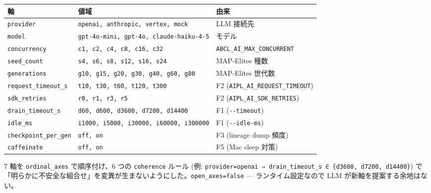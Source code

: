 \documentclass[
]{ltjsarticle}
\newcounter{none} %
\begin{document}
{\def\LTcaptype{none} %
\begin{longtable}[]{@{}
  >{\raggedright\arraybackslash}p{}
  >{\raggedright\arraybackslash}p{}
  >{\raggedright\arraybackslash}p{}@{}}
\toprule\noalign{}
\begin{minipage}[b]{\linewidth}\raggedright
軸
\end{minipage} & \begin{minipage}[b]{\linewidth}\raggedright
値域
\end{minipage} & \begin{minipage}[b]{\linewidth}\raggedright
由来
\end{minipage} \\
\midrule\noalign{}
\endhead
\bottomrule\noalign{}
\endlastfoot
\texttt{provider} & \texttt{openai,\ anthropic,\ vertex,\ mock} & LLM
接続先 \\
\texttt{model} & \texttt{gpt-4o-mini,\ gpt-4o,\ claude-haiku-4-5} &
モデル \\
\texttt{concurrency} & \texttt{c1,\ c2,\ c4,\ c8,\ c16,\ c32} &
\texttt{ABCL\_AI\_MAX\_CONCURRENT} \\
\texttt{seed\_count} & \texttt{s4,\ s6,\ s8,\ s12,\ s16,\ s24} &
MAP-Elites 種数 \\
\texttt{generations} & \texttt{g10,\ g15,\ g20,\ g30,\ g40,\ g60,\ g80}
& MAP-Elites 世代数 \\
\texttt{request\_timeout\_s} & \texttt{t10,\ t30,\ t60,\ t120,\ t300} &
F2 (\texttt{AIPL\_AI\_REQUEST\_TIMEOUT}) \\
\texttt{sdk\_retries} & \texttt{r0,\ r1,\ r3,\ r5} & F2
(\texttt{AIPL\_AI\_SDK\_RETRIES}) \\
\texttt{drain\_timeout\_s} &
\texttt{d60,\ d600,\ d3600,\ d7200,\ d14400} & F1
(\texttt{-\/-timeout}) \\
\texttt{idle\_ms} & \texttt{i1000,\ i5000,\ i30000,\ i60000,\ i300000} &
F1 (\texttt{-\/-idle-ms}) \\
\texttt{checkpoint\_per\_gen} & \texttt{off,\ on} & F3 (lineage dump
頻度) \\
\texttt{caffeinate} & \texttt{off,\ on} & F5 (Mac sleep 対策) \\
\end{longtable}
}

7 軸を \texttt{ordinal\_axes} で順序付け、6 つの \texttt{coherence}
ルール (例:
\texttt{provider=openai\ ⇒\ drain\_timeout\_s\ ∈\ \{d3600,\ d7200,\ d14400\}})
で「明らかに不安全な組合せ」を変異が生まないようにした。\texttt{open\_axes=false}
--- ランタイム設定なので LLM が新軸を提案する余地はない。
\end{document}

